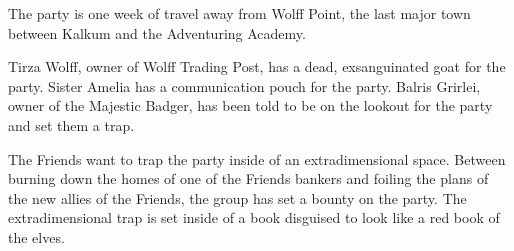 The party is one week of travel away from Wolff Point, the last major town between Kalkum and the Adventuring Academy.

Tirza Wolff, owner of Wolff Trading Post, has a dead, exsanguinated goat for the party.
Sister Amelia has a communication pouch for the party.
Balris Grirlei, owner of the Majestic Badger, has been told to be on the lookout for the party and set them a trap.

The Friends want to trap the party inside of an extradimensional space.
Between burning down the homes of one of the Friends bankers and foiling the plans of the new allies of the Friends, the group has set a bounty on the party.
The extradimensional trap is set inside of a book disguised to look like a red book of the elves.
